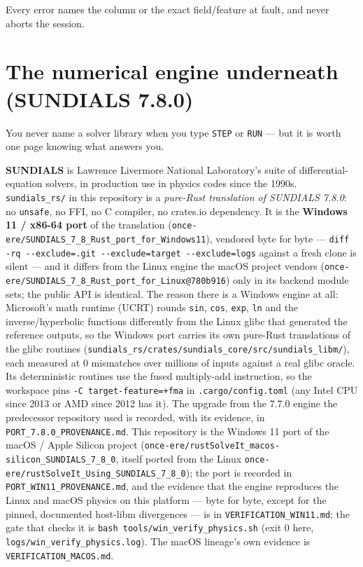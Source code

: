 \documentclass[11pt]{article}
\newcommand{\kw}[1]{\texttt{\uppercase{#1}}}
\newcommand{\code}[1]{\texttt{#1}}
\begin{document}
Every error names the column or the exact field/feature at fault, and
never aborts the session.

\section{The numerical engine underneath (SUNDIALS 7.8.0)}

You never name a solver library when you type \kw{step} or \kw{run} ---
but it is worth one page knowing what answers you.

\textbf{SUNDIALS} is Lawrence Livermore National Laboratory's suite of
differential-equation solvers, in production use in physics codes since
the 1990s. \code{sundials\_rs/} in this repository is a \emph{pure-Rust
translation of SUNDIALS 7.8.0}: no \code{unsafe}, no FFI, no C compiler,
no crates.io dependency. It is the \textbf{Windows 11 / x86-64 port} of
the translation
(\code{once-ere/SUNDIALS\_7\_8\_Rust\_port\_for\_Windows11}), vendored
byte for byte --- \code{diff -rq -{}-exclude=.git -{}-exclude=target
-{}-exclude=logs} against a fresh clone is silent --- and it differs
from the Linux engine the macOS project vendors
(\code{once-ere/SUNDIALS\_7\_8\_Rust\_port\_for\_Linux@780b916}) only
in its backend module sets; the public API is identical. The reason
there is a Windows engine at all: Microsoft's math runtime (UCRT)
rounds \code{sin}, \code{cos}, \code{exp}, \code{ln} and the
inverse/hyperbolic functions differently from the Linux glibc that
generated the reference outputs, so the Windows port carries its own
pure-Rust translations of the glibc routines
(\code{sundials\_rs/crates/sundials\_core/src/sundials\_libm/}), each
measured at 0 mismatches over millions of inputs against a real glibc
oracle. Its deterministic routines use the fused multiply-add
instruction, so the workspace pins \code{-C target-feature=+fma} in
\code{.cargo/config.toml} (any Intel CPU since 2013 or AMD since 2012
has it). The upgrade from the 7.7.0 engine the predecessor repository
used is recorded, with its evidence, in
\code{PORT\_7.8.0\_PROVENANCE.md}. This repository is the Windows 11
port of the macOS / Apple Silicon project
(\code{once-ere/rustSolveIt\_macos-silicon\_SUNDIALS\_7\_8\_0}, itself
ported from the Linux \code{once-ere/rustSolveIt\_Using\_SUNDIALS\_7\_8\_0});
the port is recorded in \code{PORT\_WIN11\_PROVENANCE.md}, and the
evidence that the engine reproduces the Linux and macOS physics on
this platform --- byte for byte, except for the pinned, documented
host-libm divergences --- is in \code{VERIFICATION\_WIN11.md}; the gate
that checks it is \code{bash tools/win\_verify\_physics.sh} (exit 0
here, \code{logs/win\_verify\_physics.log}). The macOS lineage's own
evidence is \code{VERIFICATION\_MACOS.md}.
\end{document}
